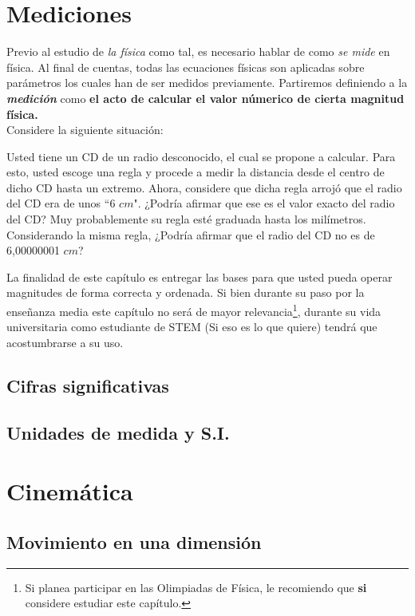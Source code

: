 \chapter{Mediciones}
 Previo al estudio de \emph{la f\'isica} como tal, es necesario hablar de como \emph{se mide} en f\'isica. Al final de cuentas, todas las 
 ecuaciones f\'isicas son aplicadas sobre par\'ametros los cuales han de ser medidos previamente. 
 Partiremos definiendo a la \textbf{\emph{medici\'on}} como \textbf{el acto de calcular el valor n\'umerico de cierta magnitud f\'isica.}\\
 Considere la siguiente situación: 
 \begin{mdframed}[backgroundcolor=gf]
  Usted tiene un CD de un radio desconocido, el cual se propone a calcular. Para esto, usted escoge una regla
  y procede a medir la distancia desde el centro de dicho CD hasta un extremo. Ahora, considere que dicha regla arrojó que el radio del CD era
  de unos ``6 $cm$". ¿Podría afirmar que ese es el valor exacto del radio del CD? Muy probablemente su regla esté graduada hasta los milímetros.
  Considerando la misma regla, ¿Podría afirmar que el radio del CD no es de 6,00000001 $cm$?
 \end{mdframed}
 La finalidad de este capítulo es entregar las bases para que usted pueda operar magnitudes de forma correcta y ordenada. Si bien durante su 
 paso por la enseñanza media este cap\'itulo no ser\'a de mayor relevancia\footnote{Si planea participar en las Olimpiadas de F\'isica, le 
 recomiendo que \textbf{si} considere estudiar este cap\'itulo.},  durante su vida universitaria como estudiante de STEM (Si eso es lo 
 que quiere) tendr\'a que acostumbrarse a su uso.
 
 \section{Cifras significativas}
 
 
 
 \section{Unidades de medida y S.I.}
\chapter{Cinemática}
 \section{Movimiento en una dimensi\'on}
